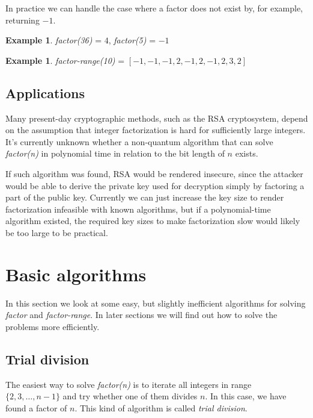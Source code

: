 \documentclass[12pt] {article}
\theoremstyle{plain}
\theoremstyle{definition}
\newtheorem{exmp}[thm]{Example}
\begin{document}
In practice we can handle the case where a factor does not exist by, for example, returning $-1$.

\begin{exmp}
\textit{factor(36)} = $4$, \textit{factor(5)} = $-1$
\end{exmp}

\begin{exmp}
\textit{factor-range(10)} = $[-1, -1, -1, 2, -1, 2, -1, 2, 3, 2]$
\end{exmp}

\subsection {Applications}

Many present-day cryptographic methods, such as the RSA cryptosystem, depend on the assumption that integer factorization is hard for sufficiently large integers. It's currently unknown whether a non-quantum algorithm that can solve \textit{factor(n)} in polynomial time in relation to the bit length of $n$ exists\cite{stein}.

If such algorithm was found, RSA would be rendered insecure, since the attacker would be able to derive the private key used for decryption simply by factoring a part of the public key. Currently we can just increase the key size to render factorization infeasible with known algorithms, but if a polynomial-time algorithm existed, the required key sizes to make factorization slow would likely be too large to be practical.

\section {Basic algorithms}

In this section we look at some easy, but slightly inefficient algorithms for solving \textit{factor} and \textit{factor-range}. In later sections we will find out how to solve the problems more efficiently.

\subsection {Trial division}

The easiest way to solve \textit{factor(n)} is to iterate all integers in range $\{2, 3, \dots, n-1\}$ and try whether one of them divides $n$. In this case, we have found a factor of $n$. This kind of algorithm is called \textit{trial division}. 
\end{document}

